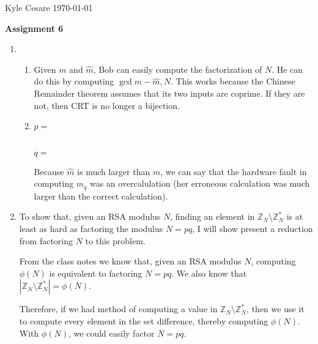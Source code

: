 \documentclass[12pt,letterpaper]{article}
\newcommand{\Z}{\mathbb{Z}}
\begin{document}
Kyle Cesare \hfill
\today \hfill

{\center\textbf{Assignment 6} \\}

\begin{enumerate}
  \item
    \begin{enumerate}
      \item Given $m$ and $\hat{m}$, Bob can easily compute the factorization of
        $N$. He can do this by computing $\gcd{m - \hat{m}, N}$. This works
        because the Chinese Remainder theorem assumes that its two inputs are
        coprime. If they are not, then CRT is no longer a bijection.
      \item $p =$\par
        \\
        $q =$\par

        Because $\hat{m}$ is much larger than $m$, we can say that the hardware
        fault in computing $m_q$ was an overcalulation (her erroneous
        calculation was much larger than the correct calculation).

    \end{enumerate}
  \item To show that, given an RSA modulus $N$, finding an element in $\Z_N
    \setminus \Z_N^*$ is at least as hard as factoring the modulus $N = pq$, I
    will show present a reduction from factoring $N$ to this problem.

    From the class notes we know that, given an RSA modulus $N$, computing
    $\phi(N)$ is equivalent to factoring $N = pq$. We also know that $|\Z_N
    \setminus \Z_N^*| = \phi(N)$.

    Therefore, if we had method of computing a value in $\Z_N \setminus \Z_N^*$,
    then we use it to compute every element in the set difference, thereby
    computing $\phi(N)$. With $\phi(N)$, we could easily factor $N = pq$.


\end{enumerate}
\end{document}
